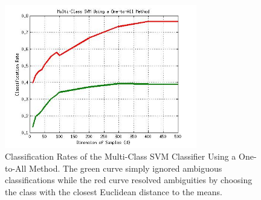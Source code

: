 \documentclass[journal]{IEEEtran}
\begin{document}
\begin{figure}[!h]
\centering
\includegraphics[width=3.3in]{../images/one2all_rate_svm.jpg}
\caption{Classification Rates of the Multi-Class SVM Classifier Using a One-to-All Method. The green curve simply ignored ambiguous classifications while the red curve resolved ambiguities by choosing the class with the closest Euclidean distance to the means.}
\label{fig:multi_svm_rate}
\end{figure}
\end{document}
